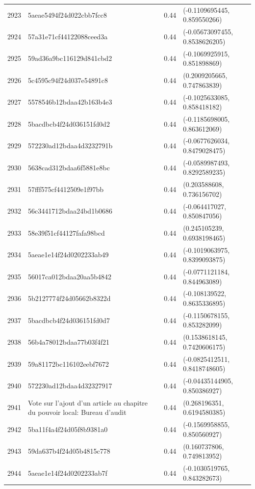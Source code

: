 \begin{table}[ht]
\begin{tabular}{rlrl}
  2923 & 5aeae5494f24d022cbb7fcc8 & 0.44 & (-0.1109695445, 0.859550266) \\ 
  2924 & 57a31e71cf44122088ceed3a & 0.44 & (-0.05673097455, 0.8538626205) \\ 
  2925 & 59ad36a9bc116129d841cbd2 & 0.44 & (-0.1069925915, 0.851898869) \\ 
  2926 & 5c4595c94f24d037e54891c8 & 0.44 & (0.2009205665, 0.747863839) \\ 
  2927 & 5578546b12bdaa42b163b4e3 & 0.44 & (-0.1025633085, 0.858418182) \\ 
  2928 & 5bacdbcb4f24d036151fd0d2 & 0.44 & (-0.1185698005, 0.863612069) \\ 
  2929 & 572230ad12bdaa4d3232791b & 0.44 & (-0.0677626034, 0.8479028475) \\ 
  2930 & 5638cad312bdaa6f5881e8bc & 0.44 & (-0.0589987493, 0.8292589235) \\ 
  2931 & 57fff575cf4412509e1f97bb & 0.44 & (0.203588608, 0.736156702) \\ 
  2932 & 56c3441712bdaa24bd1b0686 & 0.44 & (-0.064417027, 0.850847056) \\ 
  2933 & 58e39f51cf44127fafa98bcd & 0.44 & (0.245105239, 0.6938198465) \\ 
  2934 & 5aeae1e14f24d0202233ab49 & 0.44 & (-0.1019063975, 0.8399093875) \\ 
  2935 & 56017ca012bdaa20aa5b4842 & 0.44 & (-0.0771121184, 0.844963089) \\ 
  2936 & 5b2127774f24d05662b8322d & 0.44 & (-0.108139522, 0.8635336895) \\ 
  2937 & 5bacdbcb4f24d036151fd0d7 & 0.44 & (-0.1150678155, 0.853282099) \\ 
  2938 & 56b4a78012bdaa77b03f4f21 & 0.44 & (0.1538618145, 0.7420606175) \\ 
  2939 & 59a81172bc116102eebf7672 & 0.44 & (-0.0825412511, 0.8418748605) \\ 
  2940 & 572230ad12bdaa4d32327917 & 0.44 & (-0.04435144905, 0.850386927) \\ 
  2941 & Vote sur l'ajout d'un article au chapitre du pouvoir local: Bureau d'audit & 0.44 & (0.268196351, 0.6194580385) \\ 
  2942 & 5ba11f4a4f24d05f8b9381a0 & 0.44 & (-0.1569958855, 0.850560927) \\ 
  2943 & 59da637b4f24d05b4815c778 & 0.44 & (0.160737806, 0.749813952) \\ 
  2944 & 5aeae1e14f24d0202233ab7f & 0.44 & (-0.1030519765, 0.843282673) \\ 

\end{tabular}
\end{table}
